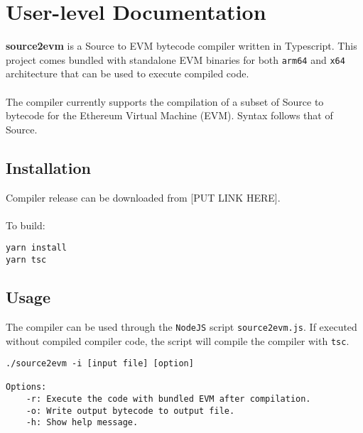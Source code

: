 \tableofcontents
\setcounter{secnumdepth}{3}
\newpage


\label{Chapter1} %


\newcommand{\keyword}[1]{\textbf{#1}}
\newcommand{\tabhead}[1]{\textbf{#1}}
\newcommand{\code}[1]{\texttt{#1}}
\newcommand{\file}[1]{\texttt{\bfseries#1}}
\newcommand{\option}[1]{\texttt{\itshape#1}}


\section{User-level Documentation}
\textbf{source2evm} is a Source to EVM bytecode compiler written in Typescript. This project comes bundled with standalone EVM binaries for both \code{arm64} and \code{x64} architecture that can be used to execute compiled code.\\\\
The compiler currently supports the compilation of a subset of Source to bytecode for the Ethereum Virtual Machine (EVM). Syntax follows that of Source. 

\subsection{Installation}
Compiler release can be downloaded from [PUT LINK HERE]. \\\\
To build: 
\begin{verbatim}
yarn install
yarn tsc
\end{verbatim}

\subsection{Usage}
The compiler can be used through the \code{NodeJS} script \code{source2evm.js}. If executed without compiled compiler code, the script will compile the compiler with \code{tsc}. 
\begin{verbatim}
./source2evm -i [input file] [option]

Options: 
    -r: Execute the code with bundled EVM after compilation. 
    -o: Write output bytecode to output file. 
    -h: Show help message. 
\end{verbatim}

